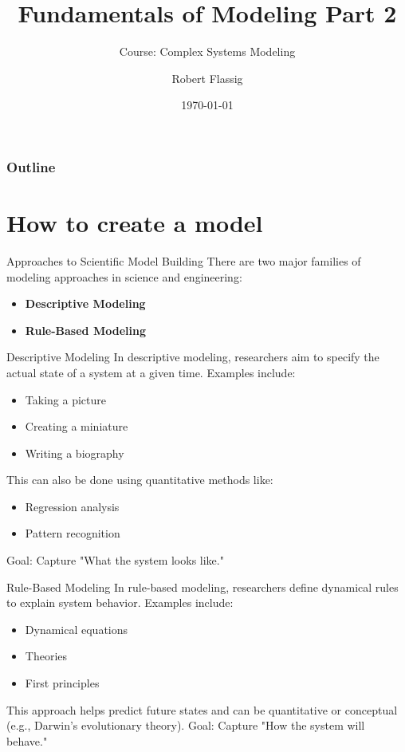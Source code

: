\documentclass{beamer}
\title{Fundamentals of Modeling Part 2}
\subtitle{Course: Complex Systems Modeling}
\author{Robert Flassig}
\institute{Brandenburg University of Applied Sciences}
\date{\today}
\begin{document}
\begin{frame}
\titlepage
\end{frame}

\begin{frame}
\frametitle{Outline}
\tableofcontents
\end{frame}

\section{How to create a model}

\begin{frame}{Approaches to Scientific Model Building}
    There are two major families of modeling approaches in science and engineering:
    \begin{itemize}
        \item \textbf{Descriptive Modeling}
        \item \textbf{Rule-Based Modeling}
    \end{itemize}
\end{frame}

\begin{frame}{Descriptive Modeling}
    In descriptive modeling, researchers aim to specify the actual state of a system at a given time. Examples include:
    \begin{itemize}
        \item Taking a picture
        \item Creating a miniature
        \item Writing a biography
    \end{itemize}
    This can also be done using quantitative methods like:
    \begin{itemize}
        \item Regression analysis
        \item Pattern recognition
    \end{itemize}
    Goal: Capture "What the system looks like."
\end{frame}

\begin{frame}{Rule-Based Modeling}
    In rule-based modeling, researchers define dynamical rules to explain system behavior. Examples include:
    \begin{itemize}
        \item Dynamical equations
        \item Theories
        \item First principles
    \end{itemize}
    This approach helps predict future states and can be quantitative or conceptual (e.g., Darwin's evolutionary theory).
    \newline
    Goal: Capture "How the system will behave."
\end{frame}
\end{document}

